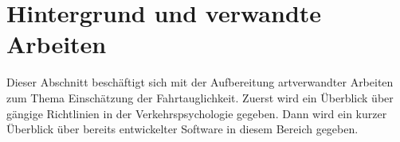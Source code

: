 \section{Hintergrund und verwandte Arbeiten}
\label{relatedWork}
Dieser Abschnitt beschäftigt sich mit der Aufbereitung artverwandter Arbeiten zum Thema Einschätzung der Fahrtauglichkeit. Zuerst wird ein Überblick über gängige Richtlinien in der Verkehrspsychologie gegeben. Dann wird ein kurzer Überblick über bereits entwickelter Software in diesem Bereich gegeben.